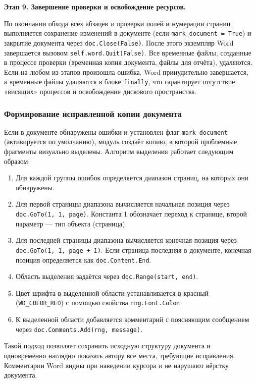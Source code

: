\textbf{Этап 9. Завершение проверки и освобождение ресурсов.}

По окончании обхода всех абзацев и проверки полей и нумерации страниц выполняется сохранение изменений в документе (если \texttt{mark\_document = True}) и закрытие документа через \texttt{doc.Close(False)}. После этого экземпляр Word завершается вызовом \texttt{self.word.Quit(False)}. Все временные файлы, созданные в процессе проверки (временная копия документа, файлы для отчёта), удаляются. Если на любом из этапов произошла ошибка, Word принудительно завершается, а временные файлы удаляются в блоке \texttt{finally}, что гарантирует отсутствие «висящих» процессов и освобождение дискового пространства.

\subsubsection{Формирование исправленной копии документа}

Если в документе обнаружены ошибки и установлен флаг \texttt{mark\_document} (активируется по умолчанию), модуль создаёт копию, в которой проблемные фрагменты визуально выделены. Алгоритм выделения работает следующим образом:

\begin{enumerate}
	\item Для каждой группы ошибок определяется диапазон страниц, на которых они обнаружены.
	\item Для первой страницы диапазона вычисляется начальная позиция через \texttt{doc.GoTo(1, 1, page)}. Константа 1 обозначает переход к странице, второй параметр — тип объекта (страница).
	\item Для последней страницы диапазона вычисляется конечная позиция через \texttt{doc.GoTo(1, 1, page + 1)}. Если страница последняя в документе, конечная позиция определяется как \texttt{doc.Content.End}.
	\item Область выделения задаётся через \texttt{doc.Range(start, end)}.
	\item Цвет шрифта в выделенной области устанавливается в красный (\texttt{WD\_COLOR\_RED}) с помощью свойства \texttt{rng.Font.Color}.
	\item К выделенной области добавляется комментарий с поясняющим сообщением через \texttt{doc.Comments.Add(rng, message)}.
\end{enumerate}

Такой подход позволяет сохранить исходную структуру документа и одновременно наглядно показать автору все места, требующие исправления. Комментарии Word видны при наведении курсора и не нарушают вёрстку документа.

